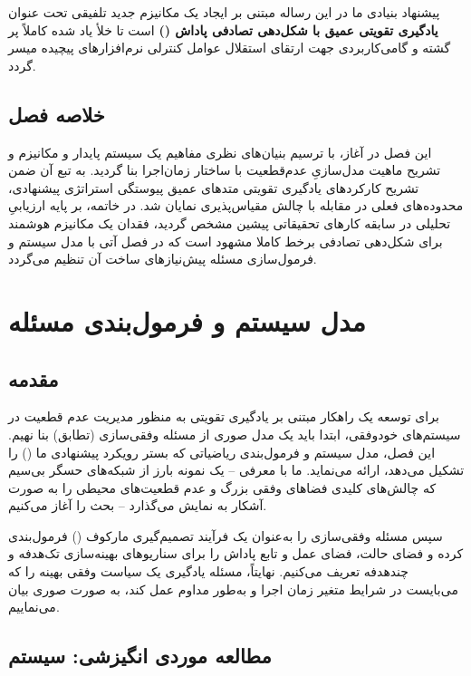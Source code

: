 \documentclass[oneside,openany,phd]{TMU-Thesis}
\begin{document}
پیشنهاد بنیادی ما در این رساله مبتنی بر ایجاد یک مکانیزم جدید تلفیقی تحت عنوان \textbf{یادگیری تقویتی عمیق با شکل‌دهی تصادفی پاداش ()} است تا خلأ یاد شده کاملاً پر گشته و گامی‌کاربردی جهت ارتقای استقلال عوامل کنترلی نرم‌افزارهای پیچیده میسر گردد.

\section{خلاصه فصل}

این فصل در آغاز، با ترسیم بنیان‌های نظری مفاهیم یک سیستم پایدار و مکانیزم  و تشریح ماهیت مدل‌سازیِ عدم‌قطعیت با ساختار زمان‌اجرا بنا گردید. به تبع آن ضمن تشریح کارکردهای یادگیری تقویتی متدهای عمیق پیوستگی استراتژی پیشنهادی، محدوده‌های فعلی در مقابله با چالش مقیاس‌پذیری نمایان شد. در خاتمه، بر پایه ارزیابیِ تحلیلی در سابقه کارهای تحقیقاتی پیشین مشخص گردید، فقدان یک مکانیزم هوشمند برای شکل‌دهی تصادفی برخط کاملا مشهود است که در فصل آتی با مدل سیستم و فرمول‌سازی مسئله پیش‌نیازهای ساخت آن تنظیم می‌گردد.

\newpage

\chapter{مدل سیستم و فرمول‌بندی مسئله}
\section{مقدمه}

برای توسعه یک راهکار مبتنی بر یادگیری تقویتی به منظور مدیریت عدم قطعیت در سیستم‌های خودوفقی، ابتدا باید یک مدل صوری از مسئله وفقی‌سازی (تطابق) بنا نهیم. این فصل، مدل سیستم و فرمول‌بندی ریاضیاتی که بستر رویکرد پیشنهادی ما () را تشکیل می‌دهد، ارائه می‌نماید. ما با معرفی  -- یک نمونه بارز از شبکه‌های حسگر بی‌سیم که چالش‌های کلیدی فضاهای وفقی بزرگ و عدم قطعیت‌های محیطی را به صورت آشکار به نمایش می‌گذارد -- بحث را آغاز می‌کنیم.

سپس مسئله وفقی‌سازی را به‌عنوان یک فرآیند تصمیم‌گیری مارکوف () فرمول‌بندی کرده و فضای حالت، فضای عمل و تابع پاداش را برای سناریوهای بهینه‌سازی تک‌هدفه و چندهدفه تعریف می‌کنیم. نهایتاً، مسئله یادگیری یک سیاست وفقی بهینه را که می‌بایست در شرایط متغیر زمان اجرا و به‌طور مداوم عمل کند، به صورت صوری بیان می‌نماییم.

\section{مطالعه موردی انگیزشی: سیستم }
\end{document}
